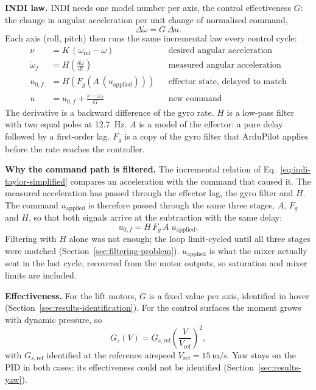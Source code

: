 \documentclass{article}
\begin{document}
\textbf{INDI law.} INDI needs one model number per axis, the control effectiveness $G$: the change in angular acceleration per unit change of normalised command,
\begin{equation}
    \Delta\dot\omega = G\,\Delta u .
    \label{eq:effectiveness}
\end{equation}
Each axis (roll, pitch) then runs the same incremental law every control cycle:
\begin{align}
    \nu &= K\,(\omega_{\mathrm{ref}}-\omega) && \text{desired angular acceleration} \nonumber\\
    \dot\omega_f &= H\!\left(\tfrac{d\omega}{dt}\right) && \text{measured angular acceleration} \nonumber\\
    u_{0,f} &= H\!\left(F_g\!\left(A\,(u_{\mathrm{applied}})\right)\right) && \text{effector state, delayed to match} \nonumber\\
    u &= u_{0,f} + \frac{\nu-\dot\omega_f}{G} && \text{new command}
    \label{eq:diagonal-inversion}
\end{align}
The derivative is a backward difference of the gyro rate. $H$ is a low-pass filter with two equal poles at \SI{12.7}{\hertz}. $A$ is a model of the effector: a pure delay followed by a first-order lag. $F_g$ is a copy of the gyro filter that ArduPilot applies before the rate reaches the controller.

\textbf{Why the command path is filtered.} The incremental relation of Eq.~\eqref{eq:indi-taylor-simplified} compares an acceleration with the command that caused it. The measured acceleration has passed through the effector lag, the gyro filter and $H$. The command $u_{\mathrm{applied}}$ is therefore passed through the same three stages, $A$, $F_g$ and $H$, so that both signals arrive at the subtraction with the same delay:
\begin{equation}
    u_{0,f} = H\,F_g\,A\;u_{\mathrm{applied}} .
    \label{eq:sync-fix}
\end{equation}
Filtering with $H$ alone was not enough; the loop limit-cycled until all three stages were matched (Section~\ref{sec:filtering-problem}). $u_{\mathrm{applied}}$ is what the mixer actually sent in the last cycle, recovered from the motor outputs, so saturation and mixer limits are included.

\textbf{Effectiveness.} For the lift motors, $G$ is a fixed value per axis, identified in hover (Section~\ref{sec:results-identification}). For the control surfaces the moment grows with dynamic pressure, so
\begin{equation}
    G_s(V) = G_{s,\mathrm{ref}}\left(\frac{V}{V_{\mathrm{ref}}}\right)^{2},
    \label{eq:fw-indi-scaling}
\end{equation}
with $G_{s,\mathrm{ref}}$ identified at the reference airspeed $V_{\mathrm{ref}}=\SI{15}{\meter\per\second}$. Yaw stays on the PID in both cases: its effectiveness could not be identified (Section~\ref{sec:results-yaw}).
\end{document}
